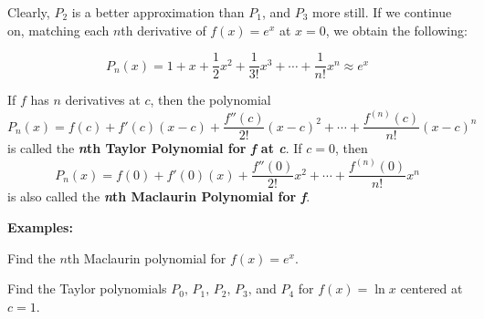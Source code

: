 \documentclass[addpoints, 12pt]{exam}
\begin{document}
Clearly, $P_2$ is a better approximation than $P_1$, and $P_3$ more still. If we continue on, matching each $n$th derivative of $f(x)=e^x$ at $x=0$, we obtain the following:

\[P_n(x)=1+x+\frac{1}{2}x^2+\frac{1}{3!}x^3+\cdots+\frac{1}{n!}x^n\approx e^x\]

\vspace{.1in}

\begin{tcolorbox}[title= DEFINITIONS OF THE \textit{\textbf{n}}TH TAYLOR POLYNOMIAL AND \textbf{\textit{n}}TH MACLAURIN POLYNOMIAL,colframe=black,sharp corners,colback=white,colbacktitle=white,coltitle=black]

    If $f$ has $n$ derivatives at $c$, then the polynomial
    \[P_n(x)=f(c)+f'(c)(x-c)+\frac{f''(c)}{2!}(x-c)^2+\cdots+\frac{f^{(n)}(c)}{n!}(x-c)^n\]
    is called the \textbf{\textit{n}th Taylor Polynomial for \textit{f} at \textit{c}}. If $c=0$, then
    \[P_n(x)=f(0)+f'(0)(x)+\frac{f''(0)}{2!}x^2+\cdots+\frac{f^{(n)}(0)}{n!}x^n\]
    is also called the \textbf{\textit{n}th Maclaurin Polynomial for \textit{f}}. 

\end{tcolorbox}

\newpage

\noindent\textbf{Examples:}
\begin{questions}
    \question Find the $n$th Maclaurin polynomial for $f(x)=e^x$.
    
    \question Find the Taylor polynomials $P_0,\,P_1,\,P_2,\,P_3,\,$and $P_4$ for $f(x)=\ln x$ centered at $c=1$.
\end{questions}
\end{document}
